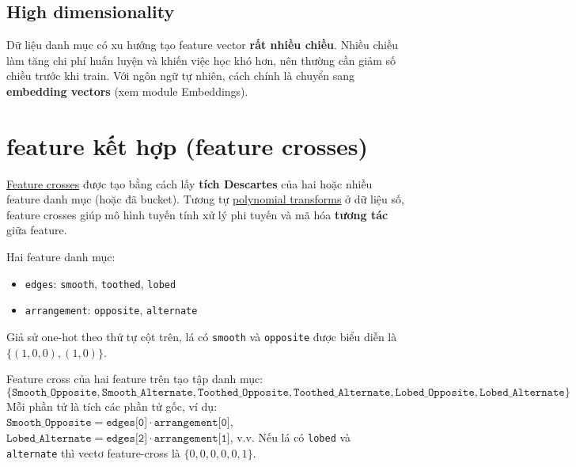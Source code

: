 \documentclass[12pt,a4paper]{article}
\begin{document}
\subsection{High dimensionality}

\begin{ynghia}
Dữ liệu danh mục có xu hướng tạo feature vector \textbf{rất nhiều chiều}. Nhiều chiều làm tăng chi phí huấn luyện và khiến việc học khó hơn, nên thường cần giảm số chiều trước khi train. Với ngôn ngữ tự nhiên, cách chính là chuyển sang \textbf{embedding vectors} (xem module Embeddings).
\end{ynghia}

\section{feature kết hợp (feature crosses)}

\begin{dinhnghia}[title={Feature cross}]
\href{https://developers.google.com/machine-learning/glossary\#feature-cross}{Feature crosses} được tạo bằng cách lấy \textbf{tích Descartes} của hai hoặc nhiều feature danh mục (hoặc đã bucket). Tương tự \href{https://developers.google.com/machine-learning/crash-course/numerical-data/polynomial-transforms}{polynomial transforms} ở dữ liệu số, feature crosses giúp mô hình tuyến tính xử lý phi tuyến và mã hóa \textbf{tương tác} giữa feature.
\end{dinhnghia}

\begin{vidu}[title={Bộ dữ liệu lá cây}]
Hai feature danh mục:
\begin{itemize}
  \item \texttt{edges}: \texttt{smooth}, \texttt{toothed}, \texttt{lobed}
  \item \texttt{arrangement}: \texttt{opposite}, \texttt{alternate}
\end{itemize}
Giả sử one-hot theo thứ tự cột trên, lá có \texttt{smooth} và \texttt{opposite} được biểu diễn là \(\{(1,0,0),(1,0)\}\).
\end{vidu}

\begin{ynghia}[title={Tích Descartes}]
Feature cross của hai feature trên tạo tập danh mục:
\[
\{\texttt{Smooth\_Opposite},\texttt{Smooth\_Alternate},\texttt{Toothed\_Opposite},\texttt{Toothed\_Alternate},\texttt{Lobed\_Opposite},\texttt{Lobed\_Alternate}\}
\]
Mỗi phần tử là tích các phần tử gốc, ví dụ:
\(\texttt{Smooth\_Opposite}=\texttt{edges[0]}\cdot\texttt{arrangement[0]}\), \(\texttt{Lobed\_Alternate}=\texttt{edges[2]}\cdot\texttt{arrangement[1]}\), v.v.
Nếu lá có \texttt{lobed} và \texttt{alternate} thì vectơ feature-cross là \(\{0,0,0,0,0,1\}\).
\end{ynghia}
\end{document}
